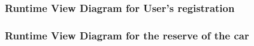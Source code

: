 \documentclass[a4paper]{article}
\begin{document}
\subsubsection{Runtime View Diagram for User's registration}
\begin{figure}[h]
\centering
\vspace*{\fill}
\noindent{}%
\vspace*{0.1cm}
\end{figure}
\newpage
\subsubsection{Runtime View Diagram for the reserve of the car}
\begin{figure}[h]
\centering
\vspace*{\fill}
\noindent{}%
\vspace*{0.1cm}
\end{figure}
\newpage
\end{document}
